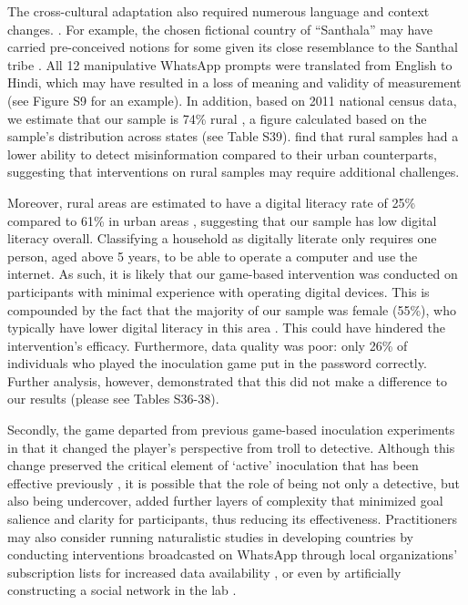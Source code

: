 \documentclass[empirical, authordate, issue]{jote-new-article}
\begin{document}
The cross-cultural adaptation also required numerous language and context changes. \parencite{Roozenbeek2020}. For example, the chosen fictional country of “Santhala” may have carried pre-conceived notions for some given its close resemblance to the Santhal tribe \parencite{EncyclopaediaBritannica2012}. All 12 manipulative \mbox{WhatsApp} prompts were translated from English to Hindi, which may have resulted in a loss of meaning and validity of measurement (see Figure S9 for an example). In addition, based on 2011 national census data, we estimate that our sample is 74\% rural \parencite{India2016}, a figure calculated based on the sample's distribution across states (see Table S39). \textcite{Shahid2022} find that rural samples had a lower ability to detect misinformation compared to their urban counterparts, suggesting that interventions on rural samples may require additional challenges.

Moreover, rural areas are estimated to have a digital literacy rate of 25\% compared to 61\% in urban areas \parencite{Mothkoor2021}, suggesting that our sample has low digital literacy overall. Classifying a household as digitally literate only requires one person, aged above 5 years, to be able to operate a computer and use the internet. As such, it is likely that our game-based intervention was conducted on participants with minimal experience with operating digital devices. This is compounded by the fact that the majority of our sample was female (55\%), who typically have lower digital literacy in this area \parencite{Rowntree2020}. This could have hindered the intervention's efficacy. Furthermore, data quality was poor: only 26\% of individuals who played the inoculation game put in the password correctly. Further analysis, however, demonstrated that this did not make a difference to our results (please see Tables S36-38).

Secondly, the game departed from previous game-based inoculation experiments in that it changed the player's perspective from troll to detective. Although this change preserved the critical element of ‘active' inoculation that has been effective previously \parencite{Pfau2005,Roozenbeek2019}, it is possible that the role of being not only a detective, but also being undercover, added further layers of complexity that minimized goal salience and clarity for participants, thus reducing its effectiveness. Practitioners may also consider running naturalistic studies in developing countries by conducting interventions broadcasted on \mbox{WhatsApp} through local organizations' subscription lists for increased data availability \parencite{Bowles2020}, or even by artificially constructing a social network in the lab \parencite{Pogorelskiy2017}.
\end{document}
